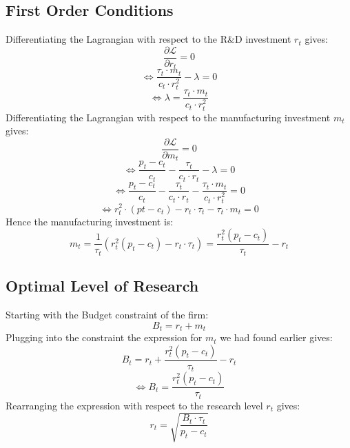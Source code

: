 \documentclass{article}
\begin{document}
\subsection{First Order Conditions}
\label{sec:proof3}
Differentiating the Lagrangian with respect to the R\&D investment $r_{t}$ gives:
$$\frac{\partial \mathcal{L}}{\partial r_{t}}=0$$
$$\Leftrightarrow\frac{\tau_{t}\cdot m_{t}}{c_{t}\cdot r^{2}_{t}}-\lambda=0$$
$$\Leftrightarrow\lambda=\frac{\tau_{t}\cdot m_{t}}{c_{t}\cdot r^{2}_{t}}$$
Differentiating the Lagrangian with respect to the manufacturing investment $m_{t}$ gives:
$$\frac{\partial \mathcal{L}}{\partial m_{t}}=0$$
$$\Leftrightarrow\frac{p_{t}-c_{t}}{c_{t}}-\frac{\tau_{t}}{c_{t}\cdot r_{t}}-\lambda=0$$
$$\Leftrightarrow\frac{p_{t}-c_{t}}{c_{t}}-\frac{\tau_{t}}{c_{t}\cdot r_{t}}-\frac{\tau_{t}\cdot m_{t}}{c_{t}\cdot r^{2}_{t}}=0$$
$$\Leftrightarrow{r^{2}_{t}}\cdot(p{t}-c_{t})-r_{t}\cdot \tau_{t}-\tau_{t}\cdot m_{t}=0$$
Hence the manufacturing investment is:
\begin{equation}
    m_{t}=\frac{1}{\tau_{t}}\left(r_{t}^{2}(p_{t}-c_{t})-r_{t}\cdot \tau_{t}\right)=\frac{r_{t}^{2}\left(p_{t}-c_{t}\right)}{\tau_{t}}-r_{t}
\end{equation}

\subsection{Optimal Level of Research}
\label{sec:proof4}
Starting with the Budget constraint of the firm:
$$B_{t}=r_{t}+m_{t}$$
Plugging into the constraint the expression for $m_{t}$ we had found earlier gives:
$$B_{t}=r_{t}+\frac{r_{t}^{2}\left(p_{t}-c_{t}\right)}{\tau_{t}}-r_{t}$$
$$\Leftrightarrow{B_{t}=\frac{r_{t}^{2}\left(p_{t}-c_{t}\right)}{\tau_{t}}}$$
Rearranging the expression with respect to the research level ${r_{t}}$ gives:
\begin{equation}
    r_{t}=\sqrt{\frac{B_{t}\cdot \tau_{t}}{p_{t}-c_{t}}}
\end{equation}
\end{document}
